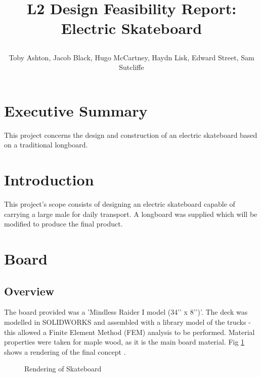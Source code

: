 \documentclass[journal,10pt]{IEEEtran}
\title{ 
\begin{huge}
\textbf{L2 Design Feasibility Report: Electric Skateboard} 
\end{huge} }
\author{Toby Ashton, Jacob Black, Hugo McCartney, Haydn Lisk, Edward Street, Sam Sutcliffe}
\begin{document}
\maketitle
\tableofcontents
\newpage
\section{Executive Summary}
        This project concerns the design and construction of an electric skateboard based on a traditional longboard.
\section{Introduction}
        This project's scope consists of designing an electric skateboard capable of carrying a large male for daily transport. A longboard was supplied which will be modified to produce the final product. 
\section{Board}
    \subsection{Overview}
        The board provided was a 'Mindless Raider I model (34’’ x 8’’)’\cite{boardModel}. The deck was modelled in SOLIDWORKS and assembled with a library model of the trucks \cite{trucksCAD} - this allowed a Finite Element Method (FEM) analysis to be performed. Material properties were taken for maple wood, as it is the main board material. Fig \ref{fig:Board_Rendering} shows a rendering of the final concept \cite{shoesCAD}. 
        \begin{figure}[H]
                \centering
                \caption{
                Rendering of Skateboard}
                \label{fig:Board_Rendering}
            \end{figure} 
\end{document}
